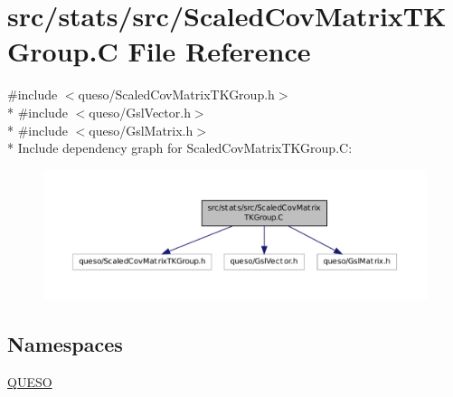 \hypertarget{_scaled_cov_matrix_t_k_group_8_c}{\section{src/stats/src/\-Scaled\-Cov\-Matrix\-T\-K\-Group.C File Reference}
\label{_scaled_cov_matrix_t_k_group_8_c}
}
{\ttfamily \#include $<$queso/\-Scaled\-Cov\-Matrix\-T\-K\-Group.\-h$>$}\\*
{\ttfamily \#include $<$queso/\-Gsl\-Vector.\-h$>$}\\*
{\ttfamily \#include $<$queso/\-Gsl\-Matrix.\-h$>$}\\*
Include dependency graph for Scaled\-Cov\-Matrix\-T\-K\-Group.\-C\-:
\nopagebreak
\begin{figure}[H]
\begin{center}
\leavevmode
\includegraphics[width=350pt]{_scaled_cov_matrix_t_k_group_8_c__incl}
\end{center}
\end{figure}
\subsection*{Namespaces}
\begin{DoxyCompactItemize}
\item 
\hyperlink{namespace_q_u_e_s_o}{Q\-U\-E\-S\-O}
\end{DoxyCompactItemize}

